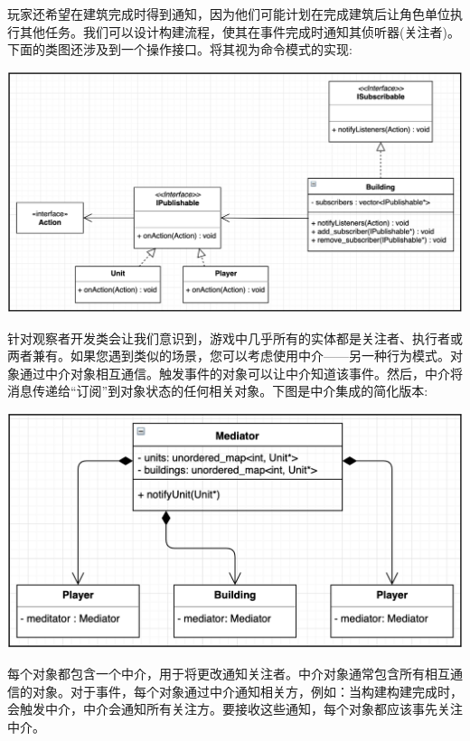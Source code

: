 玩家还希望在建筑完成时得到通知，因为他们可能计划在完成建筑后让角色单位执行其他任务。我们可以设计构建流程，使其在事件完成时通知其侦听器(关注者)。下面的类图还涉及到一个操作接口。将其视为命令模式的实现: \par

\begin{center}
	\includegraphics[width=1.0\textwidth]{content/Section-2/Chapter-11/9}
\end{center}

针对观察者开发类会让我们意识到，游戏中几乎所有的实体都是关注者、执行者或两者兼有。如果您遇到类似的场景，您可以考虑使用中介——另一种行为模式。对象通过中介对象相互通信。触发事件的对象可以让中介知道该事件。然后，中介将消息传递给“订阅”到对象状态的任何相关对象。下图是中介集成的简化版本: \par

\begin{center}
	\includegraphics[width=1.0\textwidth]{content/Section-2/Chapter-11/10}
\end{center}

每个对象都包含一个中介，用于将更改通知关注者。中介对象通常包含所有相互通信的对象。对于事件，每个对象通过中介通知相关方，例如：当构建构建完成时，会触发中介，中介会通知所有关注方。要接收这些通知，每个对象都应该事先关注中介。 \par

